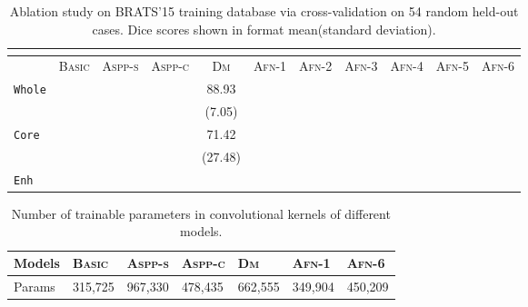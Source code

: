 \documentclass{llncs}
\begin{document}
\begin{table*}[t]
    \centering
    \small

    \begin{tabular}{lcccccccccc}
        \multicolumn{10}{c}{}\\
    	\hline
         & \textsc{Basic}        & \textsc{Aspp-s} & \textsc{Aspp-c}       & \textsc{Dm}  & \textsc{Afn}-1          & \textsc{Afn}-2          & \textsc{Afn}-3          & \textsc{Afn}-4          & \textsc{Afn}-5          & \textsc{Afn}-6          \\
        \hline

       \multirow{2}{0cm}{\texttt{Whole}} &   &    &  &  88.93& &   &   &    &   &   \\
       \ &  &     &  & (7.05)&  &   &   &    &   &  \\
       \hline
       \multirow{2}{*}{\texttt{Core}}  &   &   &   &71.42&   &    &  &    &   &   \\
       \ &   &    &  & (27.48)&  &   &   &    &   &  \\
       \hline
       \multirow{2}{*}{\texttt{Enh}} &   &    &  &&   &   &  &    &   &   \\
       \  &   &    &   &&   &   &   &    &   &  \\
    \hline
    \end{tabular}
    \caption{Ablation study on BRATS'15 training database via cross-validation on 54 random held-out cases. Dice scores shown in format mean(standard deviation).}
    \label{brats}
    \vspace{-8mm}
\end{table*}


\begin{table}[t]
\centering
\small
\label{tab:model_params}
\begin{tabu} to \textwidth {X[c]X[c]X[c]X[c]X[c]X[c]X[c]}
\hline
Models       & \textsc{Basic}             & \textsc{Aspp-s}        & \textsc{Aspp-c}& \textsc{Dm}  & \textsc{Afn}-1&\textsc{Afn}-6          \\
\hline
Params & 315,725   &967,330  &478,435 & 662,555 &349,904& 450,209 \\
\hline
\end{tabu}
\caption{Number of trainable parameters in convolutional kernels of different models.}
\vspace{-9mm}
\label{para}
\end{table}
\end{document}
